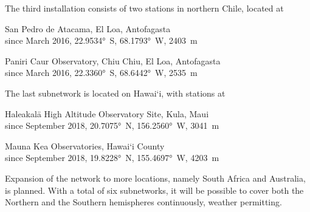         The third installation consists of two stations in northern Chile, located at
        \begin{description}[leftmargin = 25mm]
            \item[SP]       San Pedro de Atacama, El Loa, Antofagasta \\
                            since March 2016, \ang{22.9534}~S, \ang{68.1793}~W, \SI{2403}{\metre}
            \item[PC]       Paniri Caur Observatory, Chiu Chiu, El Loa, Antofagasta \\
                            since March 2016, \ang{22.3360}~S, \ang{68.6442}~W, \SI{2535}{\metre}
        \end{description}

        The last subnetwork is located on Hawai`i, with stations at
        \begin{description}[leftmargin = 25mm]
            \item[HK]       Haleakalā High Altitude Observatory Site, Kula, Maui \\
                            since September 2018, \ang{20.7075}~N, \ang{156.2560}~W, \SI{3041}{\metre}
            \item[MK]       Mauna Kea Observatories, Hawai`i County \\
                            since September 2018, \ang{19.8228}~N, \ang{155.4697}~W, \SI{4203}{\metre}
        \end{description}


        Expansion of the network to more locations, namely South Africa and Australia, is planned.
        With a total of six subnetworks, it will be possible to cover both the Northern and
        the Southern hemispheres continuously, weather permitting.
